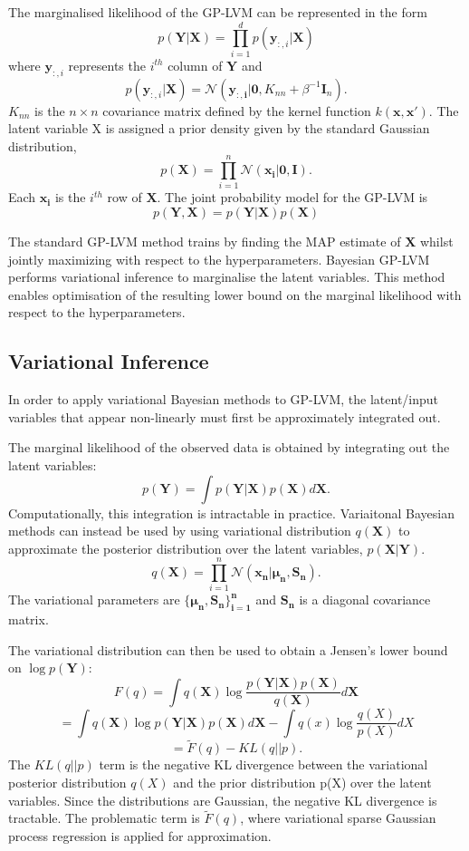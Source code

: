 \documentclass[ %
author={Dillon Keith Diep},
supervisor={Dr. Carl Henrik Ek},
degree={MEng},
title={ART-CG:},
subtitle={Assisted Real-time Content Generation of 3D Hair by Learning Manifolds},
type={Research},
year={2017} ]{dissertation}
\begin{document}
The marginalised likelihood of the GP-LVM can be represented in the form
$$p(\bm{Y|X})=\prod^d_{i=1}p(\bm{y}_{:,i}|\bm{X})$$
where $\bm{y}_{:,i}$ represents the $i^{th}$ column of $\bm{Y}$ and
$$p(\bm{y}_{:,i}|\bm{X})=\mathcal{N}(\bm{y_{:,i}|0},K_{nn}+\beta^{-1}\bm{I}_n).$$
$K_{nn}$ is the $n \times n$ covariance matrix defined by the kernel function $k(\bm{x,x'})$.
The latent variable X is assigned a prior density given by the standard Gaussian distribution, 
$$p(\bm{X})=\prod^n_{i=1}\mathcal{N}(\bm{x_i|0, I}).$$
Each $\bm{x_i}$ is the $i^{th}$ row of $\bm{X}$. The joint probability model for the GP-LVM is
$$p(\bm{Y,X})=p(\bm{Y|X})p(\bm{X})$$

The standard GP-LVM method trains by finding the MAP estimate of $\bm{X}$ whilst jointly maximizing with respect to the hyperparameters. Bayesian GP-LVM performs variational inference to marginalise the latent variables. This method enables optimisation of the resulting lower bound on the marginal likelihood with respect to the hyperparameters. 

\subsection{Variational Inference}
{ \color{red}In order to apply variational Bayesian methods to GP-LVM, the latent/input variables that appear non-linearly must first be approximately integrated out.}

The marginal likelihood of the observed data is obtained by integrating out the latent variables:
$$p(\bm{Y})=\int p(\bm{Y|X})p(\bm{X})d\bm{X}.$$
Computationally, this integration is intractable in practice. Variaitonal Bayesian methods can instead be used by using variational distribution $q(\bm{X})$ to approximate the posterior distribution over the latent variables, $p(\bm{X|Y})$.
$$q(\bm{X})=\prod^n_{i=1}\mathcal{N}(\bm{x_n|\mu_n,S_n}).$$
The variational parameters are $\bm{ \{ \mu_n,S_n \}^n_{i=1} }$ and $\bm{S_n}$ is a diagonal covariance matrix. 

The variational distribution can then be used to obtain a Jensen's lower bound on $\log p(\bm{Y})$:
$$F(q)=\int q(\bm{X})\log \frac{ p(\bm{Y|X})p(\bm{X}) }{ q(\bm{X}) } d\bm{X}$$
$$=\int q(\bm{X})\log p(\bm{Y|X})p(\bm{X})d\bm{X} - \int q(x)\log\frac{q(X)}{p(X)}dX$$
$$=\tilde{F}(q)-KL(q||p).$$
The $KL(q||p)$ term is the negative KL divergence between the variational posterior distribution $q(X)$ and the prior distribution p(X) over the latent variables. Since the distributions are Gaussian, the negative KL divergence is tractable. The problematic term is $\tilde{F}(q)$, where variational sparse Gaussian process regression is applied for approximation.
\end{document}
